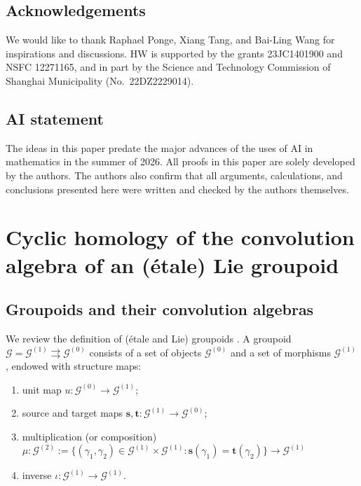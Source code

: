 \documentclass[a4paper]{amsart}
\newcommand{\maG}{\mathcal G}
\newcommand{\bs}{\mathbf{s}}
\newcommand{\bt}{\mathbf{t}}
\newcommand\<{\langle}
\renewcommand\>{\rangle}
\theoremstyle{definition}
\newtheorem{definition}[theorem]{Definition}
\theoremstyle{remark}
\begin{document}
\subsection*{Acknowledgements}
We would like to thank Raphael Ponge, Xiang Tang, and Bai-Ling Wang for inspirations and discussions.
HW is supported by the grants 23JC1401900 and NSFC 12271165,
and in part by the Science and Technology Commission of Shanghai Municipality (No.~22DZ2229014).

\subsection*{AI statement}
The ideas in this paper predate the major advances of the uses of AI in mathematics in the summer of 2026.
All proofs in this paper are solely developed by the authors.
The authors also confirm that all arguments, calculations,
and conclusions presented here were written and checked by the authors themselves.

\section{Cyclic homology of the convolution algebra of an (\'etale) Lie groupoid}

\subsection{Groupoids and their convolution algebras}
We review the definition of (\'etale and Lie) groupoids \cite{Ruan;Book, LN01, MackenzieBook05, MoerdijkFolBook, RenBook80, Sims20}.
A groupoid $\maG = \maG ^{(1)} \rightrightarrows \maG ^{(0)}$
consists of a set of objects $\maG ^{(0)}$ and a set of morphisms $\maG ^{(1)}$, endowed with structure maps:
\begin{enumerate}
\item
unit map $u : \maG^{(0)} \to \maG^{(1)}$;
\item
source and target maps $\bs , \bt : \maG ^{(1)} \to \maG ^{(0)}$;
\item
multiplication (or composition) $\mu : \maG ^{(2)}
:= \{ (\gamma _1 , \gamma _2 ) \in \maG ^{(1)} \times \maG ^{(1)} : \bs (\gamma _1 ) = \bt (\gamma _2) \} \to \maG ^{(1)}$
\item
inverse $\iota : \maG ^{(1)} \to \maG ^{(1)}$.
\end{enumerate}
\end{document}
